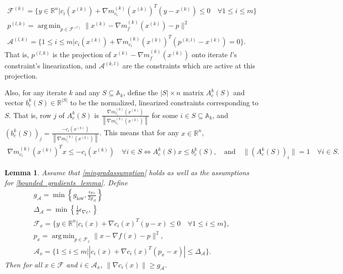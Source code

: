 \documentclass{article}
\newtheorem{lemma}[theorem]{Lemma}
\theoremstyle{case}
\DeclareMathOperator*{\argmin}{arg\,min}
\newcommand{\xk}{{x^{(k)}}}
\newcommand{\Rn}{\mathbb R^n}
\newcommand{\feasible}{{\mathcal F}}
\newcommand{\gk}{{\nabla m_f^{(k)}(x^{(k)})}}
\newcommand{\gradf}{\nabla f}
\newcommand{\gmcik}{{\nabla m_{c_i}^{(k)}(\xk)}}
\newcommand{\mingradepsilon}{{\epsilon_{\nabla c}}}
\newcommand{\mingrad}{{ g_{\text{low}} }}
\newcommand{\minactivegrad}{{ g_{\mathcal A} }}
\newcommand{\minactivegraddelta}{{\Delta_{\mathcal A}}}
\newcommand{\activeconstraintsk}{{\mathbb A_{k}}}
\begin{document}
\begin{align}
\mathcal F^{(k)} = \{ y \in \Rn | c_i(\xk) + \gmcik^T(y - \xk) \le 0 \quad \forall 1 \le i \le m\} \label{def_two_proofs_fk} \\
p^{(l, k)} = \argmin_{p \in \mathcal F^{(l)}} \|\xk - \gk - p\|^2 \label{def_two_proofs_pk} \\
\mathcal A^{(l, k)} = \{1 \le i \le m | c_i(\xk) + \gmcik^T(p^{(k, l)} - \xk) = 0 \}. \label{def_two_proofs_activeidx}
\end{align}
That is, $p^{(l, k)}$ is the projection of $\xk - \gk$ onto iterate $l$'s constraint's linearization,
and $\mathcal A^{(k, l)}$ are the constraints which are active at this projection.

Also, for any iterate $k$ and any $S \subseteq \activeconstraintsk$,
define the $|S|\times n$ matrix $A^k_c(S)$ and vector $b^k_c(S) \in \mathbb R^{|S|}$ 
to be the normalized, linearized constraints corresponding to $S$.
That is, row $j$ of $A^k_c(S)$ is $\frac{\gmcik}{\left\|\gmcik\right\|}$ for some $i \in S\subseteq \activeconstraintsk$, 
and $\left(b^k_c(S)\right)_j = \frac{-c_i(\xk)}{\left\|\gmcik\right\|}$. 
This means that for any $x \in \Rn$,
\begin{align}
\gmcik^T x \le -c_i(\xk) \quad \forall i \in S \Longleftrightarrow A^k_c(S) x \le b^k_c(S), \quad \textrm{and} \quad \|\left(A^k_c(S)\right)_i\| = 1 \quad \forall i \in S.
\label{define_normalized_constraints}
\end{align}


\begin{lemma}
\label{min_active_gradient_lemma}
Assume that \cref{mingradassumption} holds as well as the assumptions for \cref{bounded_gradients_lemma}. 
Define
\begin{align}
\minactivegrad = \min\left\{\mingrad, \frac {\mingradepsilon} {2\minactivegrad}  \right\} \nonumber \\
\minactivegraddelta = \min\left\{\frac 1 2 \mingradepsilon, \right\}\nonumber  \\
\mathcal F_x = \{ y \in \Rn | c_i(x) + \nabla c_i(x)^T(y - x) \le 0 \quad \forall 1 \le i \le m\}, \nonumber \\
p_x = \argmin_{p \in \mathcal F_x} \|x - \gradf(x) - p\|^2, \nonumber \\
\mathcal A_x = \{1 \le i \le m | \left|c_i(x) + \nabla c_i(x)^T(p_x - x)\right| \le \minactivegraddelta \}. \label{define_projection_active}
\end{align}
Then for all $x \in \feasible$ and $i \in \mathcal A_x$, $\left\|\nabla c_i(x)\right\| \ge \minactivegrad$.
\end{lemma}
\end{document}
